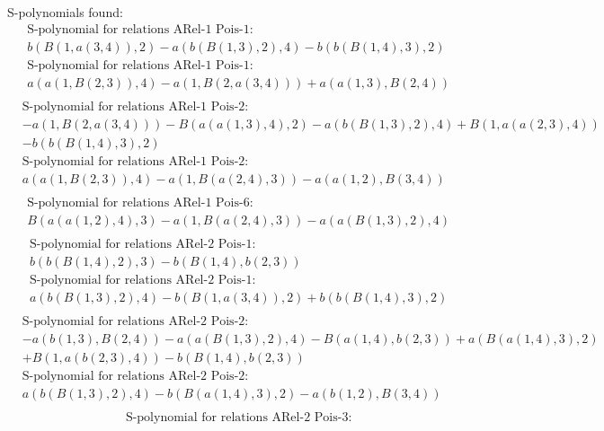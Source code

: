 \documentclass[11pt]{amsart}
\begin{document}
 S-polynomials found: 
\begin{align*} 
& \text{S-polynomial for relations ARel-1 Pois-1:} \\ 
&b(B(1,a(3,4)),2) - a(b(B(1,3),2),4) - b(b(B(1,4),3),2) \\ 
& \text{S-polynomial for relations ARel-1 Pois-1:} \\ 
&a(a(1,B(2,3)),4) - a(1,B(2,a(3,4))) + a(a(1,3),B(2,4)) \\ 
\end{align*}\begin{align*} 
& \text{S-polynomial for relations ARel-1 Pois-2:} \\ 
& - a(1,B(2,a(3,4))) - B(a(a(1,3),4),2) - a(b(B(1,3),2),4) + B(1,a(a(2,3),4))\\ 
 &  - b(b(B(1,4),3),2) \\ 
& \text{S-polynomial for relations ARel-1 Pois-2:} \\ 
&a(a(1,B(2,3)),4) - a(1,B(a(2,4),3)) - a(a(1,2),B(3,4)) \\ 
\end{align*}\begin{align*} 
& \text{S-polynomial for relations ARel-1 Pois-6:} \\ 
&B(a(a(1,2),4),3) - a(1,B(a(2,4),3)) - a(a(B(1,3),2),4) \\ 
\end{align*}\begin{align*} 
& \text{S-polynomial for relations ARel-2 Pois-1:} \\ 
&b(b(B(1,4),2),3) - b(B(1,4),b(2,3)) \\ 
& \text{S-polynomial for relations ARel-2 Pois-1:} \\ 
&a(b(B(1,3),2),4) - b(B(1,a(3,4)),2) + b(b(B(1,4),3),2) \\ 
\end{align*}\begin{align*} 
& \text{S-polynomial for relations ARel-2 Pois-2:} \\ 
& - a(b(1,3),B(2,4)) - a(a(B(1,3),2),4) - B(a(1,4),b(2,3)) + a(B(a(1,4),3),2)\\ 
 &  + B(1,a(b(2,3),4)) - b(B(1,4),b(2,3)) \\ 
& \text{S-polynomial for relations ARel-2 Pois-2:} \\ 
&a(b(B(1,3),2),4) - b(B(a(1,4),3),2) - a(b(1,2),B(3,4)) \\ 
\end{align*}\begin{align*} 
& \text{S-polynomial for relations ARel-2 Pois-3:} \\ 

\end{align*}
\end{document}
